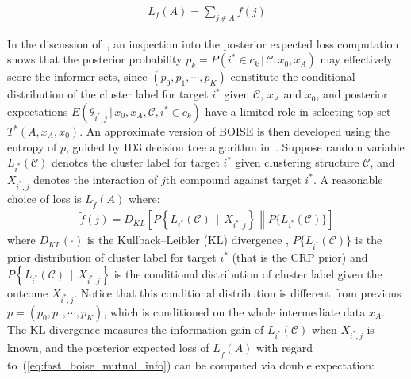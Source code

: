 \documentclass[11pt,a4paper]{article}
\theoremstyle{plain}
\begin{document}
\begin{eqnarray}
  \label{eq:fast-boise-loss}
  L_f(A) = \sum_{j\not\in A}f(j)
\end{eqnarray}

In the discussion of~\cite{yu_bayes_2022}, an inspection into the posterior expected loss computation shows that the posterior probability $p_k = P(i^*\in c_k\,|\,\mathcal{C},x_0,x_A)$ may effectively score the informer sets,
since $(p_0,p_1,\cdots,p_K)$ constitute the conditional distribution of the cluster label for target $i^*$ given $\mathcal C$, $x_A$ and $x_0$, and posterior expectations $E(\theta_{i^*,j}\,|\, x_0,x_A,\mathcal{C},i^*\in c_k)$ have a limited role in selecting top set $T^*(A,x_A,x_0)$. 
An approximate version of BOISE is then developed using the entropy of $p$, guided by ID3 decision tree algorithm in~\cite{quinlan_induction_1986}. 
Suppose random variable $L_{i^*}(\mathcal C)$ denotes the cluster label for target $i^*$ given clustering structure $\mathcal C$, and $X_{i^*, j}$ denotes the interaction of $j$th compound against target $i^*$.
A reasonable choice of loss is $L_{\tilde f}(A)$ where:
\begin{eqnarray}
\label{eq:fast_boise_mutual_info}
\tilde f(j) = D_{KL}\left[P\left\{L_{i^*}(\mathcal C) \,\mid\, X_{i^*,j}\right\} \middle\| P\{L_{i^*}(\mathcal C)\} \right]
\end{eqnarray}
where $D_{KL}(\cdot)$ is the Kullback–Leibler (KL) divergence \citep{KL-divergence}, $P\{L_{i^*}(\mathcal C)\}$ is the prior distribution of cluster label for target $i^*$ (that is the CRP prior) and $P\left\{L_{i^*}(\mathcal C) \,\mid\, X_{i^*,j}\right\}$ is the conditional distribution of cluster label given the outcome $X_{i^*,j}$. 
Notice that this conditional distribution is different from previous $p=(p_0,p_1,\cdots,p_K)$, which is conditioned on the whole intermediate data $x_A$. 
The KL divergence measures the information gain of $L_{i^*}(\mathcal C)$ when $X_{i^*,j}$ is known, and the posterior expected loss of $L_{\tilde f}(A)$ with regard to~(\ref{eq:fast_boise_mutual_info}) can be computed via double expectation:
\end{document}

